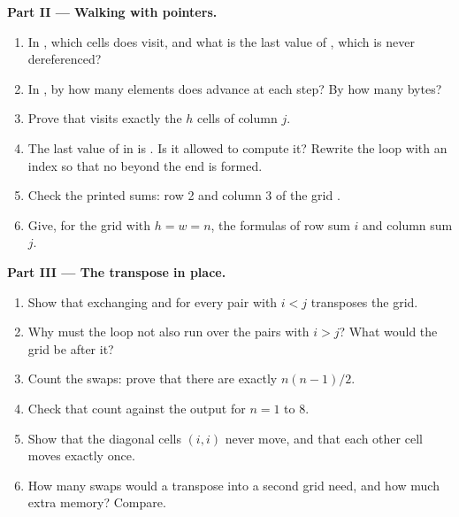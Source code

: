 \begin{problem}
\medskip\noindent\textbf{Part II --- Walking with pointers.}
\begin{enumerate}[resume]
\item In , which cells does  visit, and what is the last value of , which is never
dereferenced?
\item In , by how many elements does  advance at each step? By how many bytes?
\item Prove that  visits exactly the $h$ cells of column $j$.
\item The last value of  in  is . Is it allowed to compute it? Rewrite the
loop with an index so that no  beyond the end is formed.
\item Check the printed sums: row 2 and column 3 of the grid .
\item Give, for the grid  with $h = w = n$, the formulas of row sum $i$ and column sum $j$.
\end{enumerate}

\medskip\noindent\textbf{Part III --- The transpose in place.}
\begin{enumerate}[resume]
\item Show that exchanging  and  for every pair with $i < j$ transposes the grid.
\item Why must the loop not also run over the pairs with $i > j$? What would the grid be after it?
\item Count the swaps: prove that there are exactly $n(n-1)/2$.
\item Check that count against the output for $n = 1$ to 8.
\item Show that the diagonal cells $(i, i)$ never move, and that each other cell moves exactly once.
\item How many swaps would a transpose into a second grid need, and how much extra memory? Compare.
\end{enumerate}


\end{problem}
